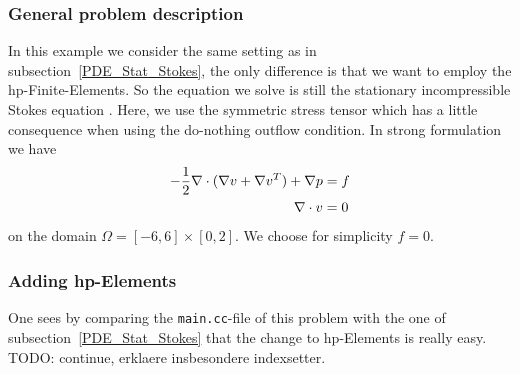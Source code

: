 \subsubsection{General problem description}
In this example we consider the same setting as in subsection~\ref{PDE_Stat_Stokes}, the only
difference is that we want to employ the hp-Finite-Elements. So the equation we solve is still 
the stationary incompressible Stokes equation . Here,
we use the symmetric stress tensor which has a little consequence when using 
the do-nothing outflow condition. In strong formulation we have
\begin{align} \label{eq:strong}
-\frac{1}{2}\nabla\cdot (\nabla v + \nabla v^{T}) + \nabla p &= f \\ 
\nabla \cdot v &= 0 \notag
\end{align} 
on the domain $\Omega = [-6,6]\times [0,2]$. We choose for simplicity $f=0$.\\

\subsubsection{Adding hp-Elements}
One sees by comparing  the \texttt{main.cc}-file of this problem with the one of subsection~\ref{PDE_Stat_Stokes} that the change to hp-Elements is really easy. TODO: continue, erklaere insbesondere indexsetter.


